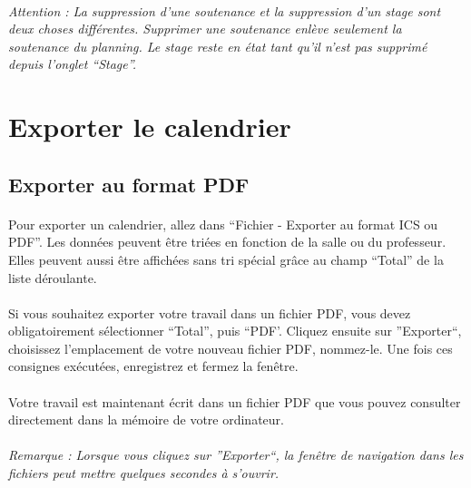 \documentclass[a4paper,10pt]{book}
\begin{document}
      \paragraph{}
	\textit{Attention : La suppression d'une soutenance et la suppression d'un stage sont deux choses différentes. Supprimer une soutenance enlève seulement la soutenance du planning. Le stage reste en état tant qu'il n'est pas supprimé depuis l'onglet ``Stage''.}
      
      
    \section{Exporter le calendrier}
      \subsection{Exporter au format PDF}
      
	\paragraph{}
	  Pour exporter un calendrier, allez dans ``Fichier - Exporter au format ICS ou PDF''.
	  Les données peuvent être triées en fonction de la salle ou du professeur.
	  Elles peuvent aussi être affichées sans tri spécial grâce au champ ``Total'' de la liste déroulante.
	  
	\paragraph{}
	  Si vous souhaitez exporter votre travail dans un fichier PDF, vous devez obligatoirement sélectionner ``Total'', puis ``PDF'.
	  Cliquez ensuite sur ''Exporter``, choisissez l'emplacement de votre nouveau fichier PDF, nommez-le.
	  Une fois ces consignes exécutées, enregistrez et fermez la fenêtre.
	
	\paragraph{}
	  Votre travail est maintenant écrit dans un fichier PDF que vous pouvez consulter directement dans la mémoire de votre ordinateur.

	\paragraph{}
	  \textit{Remarque : Lorsque vous cliquez sur ''Exporter``, la fenêtre de navigation dans les fichiers peut mettre quelques secondes à s'ouvrir.}
	
\end{document}
